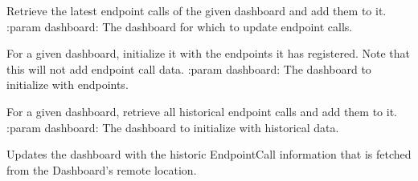 \documentclass[letterpaper,10pt,english]{sphinxmanual}
\begin{document}
\begin{fulllineitems}
\label{\detokenize{pydash_app.dashboard.services.fetching:pydash_app.dashboard.services.fetching.fetch_and_add_endpoint_calls}}
Retrieve the latest endpoint calls of the given dashboard and add them to it.
:param dashboard: The dashboard for which to update endpoint calls.

\end{fulllineitems}


\begin{fulllineitems}
\label{\detokenize{pydash_app.dashboard.services.fetching:pydash_app.dashboard.services.fetching.fetch_and_add_endpoints}}
For a given dashboard, initialize it with the endpoints it has registered.
Note that this will not add endpoint call data.
:param dashboard: The dashboard to initialize with endpoints.

\end{fulllineitems}


\begin{fulllineitems}
\label{\detokenize{pydash_app.dashboard.services.fetching:pydash_app.dashboard.services.fetching.fetch_and_add_historic_endpoint_calls}}
For a given dashboard, retrieve all historical endpoint calls and add them to it.
:param dashboard: The dashboard to initialize with historical data.

\end{fulllineitems}


\begin{fulllineitems}
\label{\detokenize{pydash_app.dashboard.services.fetching:pydash_app.dashboard.services.fetching.fetch_and_update_historic_dashboard_info}}
Updates the dashboard with the historic EndpointCall information that is fetched from the Dashboard’s remote location.

\end{fulllineitems}
\end{document}
